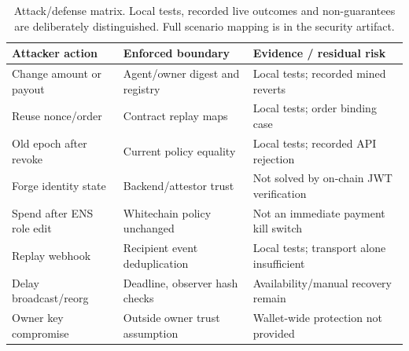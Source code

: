 \begin{table}[ht]\centering\small
\begin{tabular}{p{.26\linewidth}p{.32\linewidth}p{.31\linewidth}}\toprule
Attacker action & Enforced boundary & Evidence / residual risk\\\midrule
Change amount or payout & Agent/owner digest and registry & Local tests; recorded mined reverts\\
Reuse nonce/order & Contract replay maps & Local tests; order binding case\\
Old epoch after revoke & Current policy equality & Local tests; recorded API rejection\\
Forge identity state & Backend/attestor trust & Not solved by on-chain JWT verification\\
Spend after ENS role edit & Whitechain policy unchanged & Not an immediate payment kill switch\\
Replay webhook & Recipient event deduplication & Local tests; transport alone insufficient\\
Delay broadcast/reorg & Deadline, observer hash checks & Availability/manual recovery remain\\
Owner key compromise & Outside owner trust assumption & Wallet-wide protection not provided\\\bottomrule
\end{tabular}
\caption{Attack/defense matrix. Local tests, recorded live outcomes and non-guarantees are deliberately distinguished. Full scenario mapping is in the security artifact.}
\end{table}
